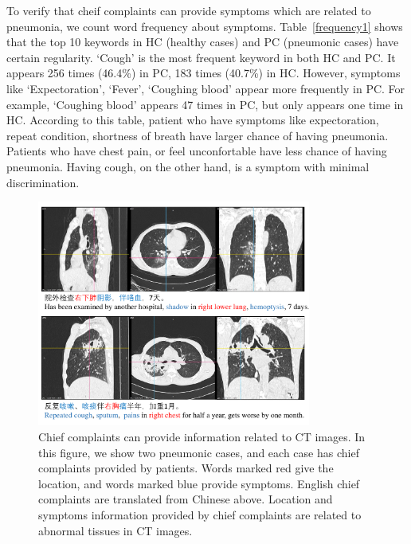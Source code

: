 \documentclass[journal]{IEEEtran}
\begin{document}
To verify that cheif complaints can provide symptoms which are related to pneumonia, we count word frequency about symptoms. Table~\ref{frequency1} shows that the top 10 keywords in HC (healthy cases) and PC (pneumonic cases) have certain regularity. `Cough' is the most frequent keyword in both HC and PC. It appears 256 times (46.4\%) in PC, 183 times (40.7\%) in HC. However, symptoms like `Expectoration', `Fever', `Coughing blood' appear more frequently in PC. For example, `Coughing blood' appears 47 times in PC, but only appears one time in HC. According to this table, patient who have symptoms like expectoration, repeat condition, shortness of breath have larger chance of having pneumonia. Patients who have chest pain, or feel unconfortable have less chance of having pneumonia. Having cough, on the other hand, is a symptom with minimal discrimination.

\begin{figure}[t]
    \centerline{\includegraphics[width=90mm]{txtpic.pdf}}
    \vspace{-0cm}
    \caption{Chief complaints can provide information related to CT images. In this figure, we show two pneumonic cases, and each case has chief complaints provided by patients. Words marked red give the location, and words marked blue provide symptoms. English chief complaints are translated from Chinese above. Location and symptoms information provided by chief complaints are related to abnormal tissues in CT images.}
    \vspace{-0cm}
    \label{txtpic}
    \end{figure}
\end{document}
